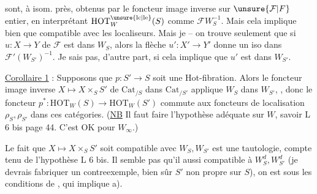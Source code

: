 
sont, à isom. près,  obtenus par le foncteur image inverse sur $\unsure{\mathcal F|F}$  entier, en interprétant $\mathrm{HOT}^{\unsure{\mathrm{lc}|\mathrm{le}}}_W(S)$ comme $\mathcal F W_S^{-1}$. Mais cela implique bien que   compatible avec les localiseurs. Mais je  -- on trouve seulement que si $u:X\longrightarrow Y$ de $\mathcal F$ est dans $W_S$, alors la flèche $u':X'\longrightarrow Y'$ donne un iso dans $\mathcal F'(W_{S'})^{-1}$.  Je  sais pas, d'autre part, si cela implique que $u'$ est dans $W_{S'}$.

\uline{Corollaire 1} : Supposons que $p:S'\longrightarrow S$ soit une Hot-fibration. Alors le foncteur image inverse $X\mapsto X\times_S S'$ de $\mathrm{Cat}_{/S}$ dans $\mathrm{Cat}_{/S'}$ applique $W_S$ dans $W_{S'}$, , donc le foncteur $p^*:\mathrm{HOT}_W(S)\longrightarrow\mathrm{HOT}_W(S')$ commute aux foncteurs de localisation $\rho_S,\rho_{S'}$ dans ces catégories. (\uline{NB} Il faut faire l'hypothèse adéquate sur $W$, savoir L 6 bis page 44. C'est OK pour $W_\infty$.)

Le fait que $X\mapsto X\times_S S'$ soit compatible avec $W_S,W_{S'}$ est une tautologie, compte tenu de l'hypothèse L 6 bis. Il  semble pas qu'il   aussi compatible à $W_S^d,W_{S'}^d$ (je devrais fabriquer un contreexemple,  bien sûr $S'$ non propre sur $S$),   on est sous les conditions de , qui implique a).
